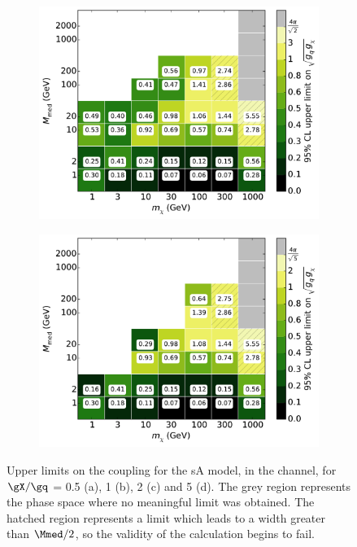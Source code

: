 \begin{figure}[h]
\begin{subfigure}[t]{0.495\textwidth}
      \includegraphics[width=1.\textwidth]{figures/grid_allpoints_SAD_rat2.pdf}
      \caption{}
    \end{subfigure}
    \begin{subfigure}[t]{0.495\textwidth}
      \centering
      \includegraphics[width=1.\textwidth]{figures/grid_allpoints_SAD_rat5.pdf}
      \caption{}
    \end{subfigure}
    \caption{Upper limits on the coupling for the sA model, in the \monoZ channel, for $\gX / \gq$ = 0.5 (a), 1 (b), 2 (c) and 5 (d). The grey region represents the phase space where no meaningful limit was obtained. The hatched region represents a limit which leads to a width greater than $\Mmed / 2$, so the validity of the calculation begins to fail.}
    \label{fig:MonoZ_SAD_couplinglimit}
\end{figure}


